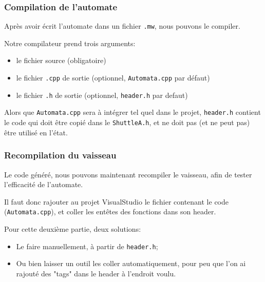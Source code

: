 \documentclass[a4paper,11pt]{article}
\begin{document}
        \subsubsection{Compilation de l'automate}
            Après avoir écrit l'automate dans un fichier \texttt{.mw}, nous pouvons le compiler.
            
            Notre compilateur prend trois arguments:
            \begin{itemize}
                \item le fichier source (obligatoire)
                \item le fichier \verb|.cpp| de sortie (optionnel, \texttt{Automata.cpp} par défaut)
                \item le fichier \verb|.h| de sortie (optionnel, \texttt{header.h} par defaut)
            \end{itemize}
            
            Alors que \texttt{Automata.cpp} sera à intégrer tel quel dans le projet, \texttt{header.h} contient le code qui doit être copié dans le \texttt{ShuttleA.h}, et ne doit pas (et ne peut pas) être utilisé en l'état.

        \subsubsection{Recompilation du vaisseau}
            Le code généré, nous pouvons maintenant recompiler le vaisseau, afin de tester l'efficacité de l'automate.
            
            Il faut donc rajouter au projet VisualStudio le fichier contenant le code (\texttt{Automata.cpp}), et coller les entêtes des fonctions dans son header.
            
            Pour cette deuxième partie, deux solutions:
            \begin{itemize}
                \item Le faire manuellement, à partir de \texttt{header.h};
                \item Ou bien laisser un outil les coller automatiquement, pour peu que l'on ai rajouté des "tags" dans le header à l'endroit voulu. 
            \end{itemize}
            
\end{document}
